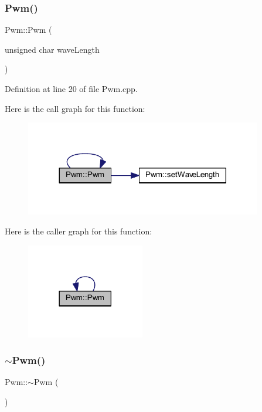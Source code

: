 \subsubsection{\texorpdfstring{Pwm()}{Pwm()}}
{\footnotesize\ttfamily Pwm\+::\+Pwm (\begin{DoxyParamCaption}\item[{unsigned char}]{wave\+Length }\end{DoxyParamCaption})}



Definition at line 20 of file Pwm.\+cpp.

Here is the call graph for this function\+:
\nopagebreak
\begin{figure}[H]
\begin{center}
\leavevmode
\includegraphics[width=293pt]{class_pwm_af73e0bd2862428ffc7feebc0c11de5dd_cgraph}
\end{center}
\end{figure}
Here is the caller graph for this function\+:
\nopagebreak
\begin{figure}[H]
\begin{center}
\leavevmode
\includegraphics[width=146pt]{class_pwm_af73e0bd2862428ffc7feebc0c11de5dd_icgraph}
\end{center}
\end{figure}
\mbox{\label{class_pwm_ac97d5b9a021ea218147206706e368a22}} 
\subsubsection{\texorpdfstring{$\sim$\+Pwm()}{~Pwm()}}
{\footnotesize\ttfamily Pwm\+::$\sim$\+Pwm (\begin{DoxyParamCaption}{ }\end{DoxyParamCaption})}



